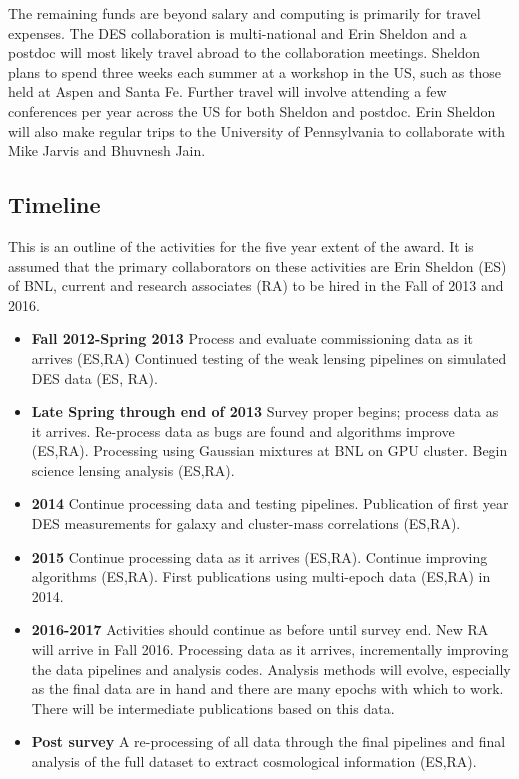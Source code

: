 \documentclass[12pt]{article}
\begin{document}
The remaining funds are beyond salary and computing is primarily for travel
expenses.   The DES collaboration is multi-national and Erin Sheldon and a
postdoc will most likely travel abroad to the collaboration meetings.  Sheldon
plans to spend three weeks each summer at a workshop in the US, such as those
held at Aspen and Santa Fe.  Further travel will involve attending a few
conferences per year across the US for both Sheldon and postdoc.  Erin Sheldon
will also make regular trips to the University of Pennsylvania to collaborate
with Mike Jarvis and Bhuvnesh Jain.

\clearpage
\newpage
\subsection{Timeline} \label{sec:timeline}

This is an outline of the activities for the five year extent of the award.  It
is assumed that the primary collaborators on these activities are Erin Sheldon
(ES) of BNL, current and research associates (RA) to be hired in the Fall of 2013
and 2016.

\begin{itemize}

\item {\bf Fall 2012-Spring 2013} Process and evaluate commissioning data as it
arrives  (ES,RA) Continued testing of the weak lensing pipelines on simulated
DES data (ES, RA).

\item {\bf Late Spring through end of 2013} Survey proper begins; process data
as it arrives.  Re-process data as bugs are found and algorithms improve
(ES,RA).  Processing using Gaussian mixtures at BNL on GPU cluster.  Begin
science lensing analysis (ES,RA).

\item {\bf 2014} Continue processing data and testing pipelines.  Publication
of first year DES measurements for galaxy and cluster-mass correlations
(ES,RA).

\item {\bf 2015} Continue processing data as it arrives (ES,RA).  Continue
improving algorithms (ES,RA).   First publications using multi-epoch data
(ES,RA) in 2014.

\item {\bf 2016-2017}  Activities should continue as before until survey end.
New RA will arrive in Fall 2016.  Processing data as it arrives, incrementally
improving the data pipelines and analysis codes.  Analysis methods will evolve,
especially as the final data are in hand and there are many epochs with which
to work.   There will be intermediate publications based on this data.

\item {\bf Post survey} A re-processing of all data through the final pipelines
and final analysis of the full dataset to extract cosmological information
(ES,RA).


\end{itemize}
\end{document}
